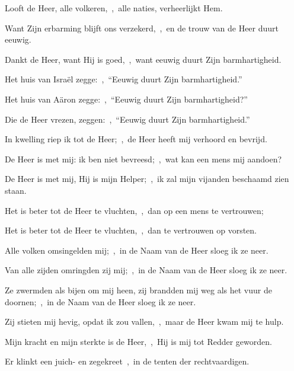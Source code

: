 \documentclass[12pt,twoside,a5paper]{article}
\begin{document}
\begin{halfparskip}
  Looft de Heer, alle volkeren,~\sep\ alle naties, verheerlijkt Hem.


  Want Zijn erbarming blijft ons verzekerd,~\sep\ en de trouw van de Heer duurt eeuwig.
\end{halfparskip}


\psalmsubtitle{}

\begin{halfparskip}
  Dankt de Heer, want Hij is goed,~\sep\ want eeuwig duurt Zijn barmhartigheid.


  Het huis van Israël zegge:~\sep\ ``Eeuwig duurt Zijn barmhartigheid.''

  Het huis van Aäron zegge:~\sep\ ``Eeuwig duurt Zijn barmhartigheid?''

  Die de Heer vrezen, zeggen:~\sep\ ``Eeuwig duurt Zijn barmhartigheid.''

  In kwelling riep ik tot de Heer;~\sep\ de Heer heeft mij verhoord en bevrijd.

  De Heer is met mij: ik ben niet bevreesd;~\sep\ wat kan een mens mij aandoen?

  De Heer is met mij, Hij is mijn Helper;~\sep\ ik zal mijn vijanden beschaamd zien staan.

  Het is beter tot de Heer te vluchten,~\sep\ dan op een mens te vertrouwen;

  Het is beter tot de Heer te vluchten,~\sep\ dan te vertrouwen op vorsten.

  Alle volken omsingelden mij;~\sep\ in de Naam van de Heer sloeg ik ze neer.

  Van alle zijden omringden zij mij;~\sep\ in de Naam van de Heer sloeg ik ze neer.

  Ze zwermden als bijen om mij heen, zij brandden mij weg als het vuur de doornen;~\sep\ in de Naam van de Heer sloeg ik ze neer.

  Zij stieten mij hevig, opdat ik zou vallen,~\sep\ maar de Heer kwam mij te hulp.

  Mijn kracht en mijn sterkte is de Heer,~\sep\ Hij is mij tot Redder geworden.

  Er klinkt een juich- en zegekreet~\sep\ in de tenten der rechtvaardigen.


\end{halfparskip}
\end{document}
